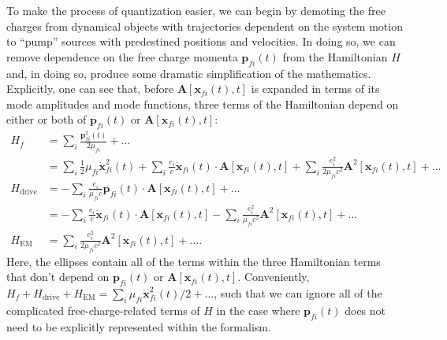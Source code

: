\documentclass{article}
\begin{document}
To make the process of quantization easier, we can begin by demoting the free charges from dynamical objects with trajectories dependent on the system motion to ``pump'' sources with predestined positions and velocities. In doing so, we can remove dependence on the free charge momenta $\mathbf{p}_{fi}(t)$ from the Hamiltonian $H$ and, in doing so, produce some dramatic simplification of the mathematics. Explicitly, one can see that, before $\mathbf{A}[\mathbf{x}_{fi}(t),t]$ is expanded in terms of its mode amplitudes and mode functions, three terms of the Hamiltonian depend on either or both of $\mathbf{p}_{fi}(t)$ or $\mathbf{A}[\mathbf{x}_{fi}(t),t]$:
\begin{equation}
\begin{split}
H_f &= \sum_i\frac{\mathbf{p}_{fi}^2(t)}{2\mu_{fi}} + \ldots\\
&= \sum_{i}\frac{1}{2}\mu_{fi}\dot{\mathbf{x}}_{fi}^2(t) + \sum_i\frac{e_i}{c}\dot{\mathbf{x}}_{fi}(t)\cdot\mathbf{A}[\mathbf{x}_{fi}(t),t] + \sum_i\frac{e_i^2}{2\mu_{fi}c^2}\mathbf{A}^2[\mathbf{x}_{fi}(t),t] + \ldots\\[0.5em]
H_\mathrm{drive} &= -\sum_i\frac{e_i}{\mu_{fi}c}\mathbf{p}_{fi}(t)\cdot\mathbf{A}[\mathbf{x}_{fi}(t),t] + \ldots\\
&= -\sum_i\frac{e_i}{c}\dot{\mathbf{x}}_{fi}(t)\cdot\mathbf{A}[\mathbf{x}_{fi}(t),t] - \sum_i\frac{e_i^2}{\mu_{fi}c^2}\mathbf{A}^2[\mathbf{x}_{fi}(t),t] + \ldots\\[0.5em]
H_\mathrm{EM} &= \sum_i\frac{e_i^2}{2\mu_{fi}c^2}\mathbf{A}^2[\mathbf{x}_{fi}(t),t] + \ldots.
\end{split}
\end{equation}
Here, the ellipses contain all of the terms within the three Hamiltonian terms that don't depend on $\mathbf{p}_{fi}(t)$ or $\mathbf{A}[\mathbf{x}_{fi}(t),t]$. Conveniently, $H_f + H_\mathrm{drive} + H_\mathrm{EM} = \sum_i\mu_{fi}\dot{\mathbf{x}}_{fi}^2(t)/2 + \ldots$, such that we can ignore all of the complicated free-charge-related terms of $H$ in the case where $\mathbf{p}_{fi}(t)$ does not need to be explicitly represented within the formalism.
\end{document}
